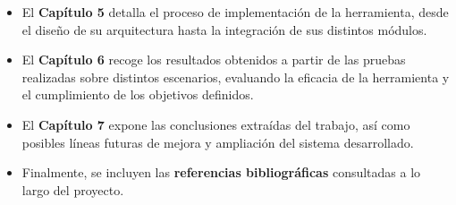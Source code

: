 \begin{parskipenv}
\begin{itemize}
    \item El \textbf{Capítulo 5} detalla el proceso de implementación de la herramienta, desde el diseño de su arquitectura hasta la integración de sus distintos módulos.
    
    \item El \textbf{Capítulo 6} recoge los resultados obtenidos a partir de las pruebas realizadas sobre distintos escenarios, evaluando la eficacia de la herramienta y el cumplimiento de los objetivos definidos.
    
    \item El \textbf{Capítulo 7} expone las conclusiones extraídas del trabajo, así como posibles líneas futuras de mejora y ampliación del sistema desarrollado.
    
    \item Finalmente, se incluyen las \textbf{referencias bibliográficas} consultadas a lo largo del proyecto. %
\end{itemize}

\end{parskipenv}